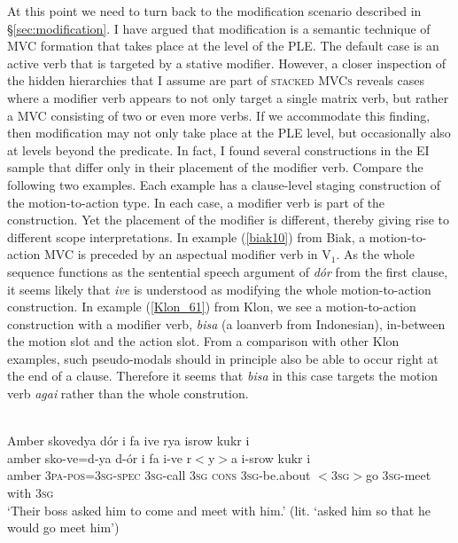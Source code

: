 {At this point we need to turn back to the modification scenario described in §\ref{sec:modification}. I have argued that modification is a semantic technique of MVC formation that takes place at the level of the PLE. The default case is an active verb that is targeted by a stative modifier. However, a closer inspection of the hidden hierarchies that I assume are part of \textsc{stacked MVCs} reveals cases where a modifier verb appears to not only target a single matrix verb, but rather a MVC consisting of two or even more verbs. If we accommodate this finding, then modification may not only take place at the PLE level, but occasionally also at levels beyond the predicate. In fact, I found several constructions in the EI sample that differ only in their placement of the modifier verb. Compare the following two examples. Each example has a clause-level staging construction of the motion-to-action type. In each case, a modifier verb is part of the construction. Yet the placement of the modifier is different, thereby giving rise to different scope interpretations. In example (\ref{biak10}) from Biak, a motion-to-action MVC is preceded by an aspectual modifier verb in V$_1$. As the whole sequence functions as the sentential speech argument of \textit{dór} from the first clause, it seems likely that \textit{ive} is understood as modifying the whole motion-to-action construction. In example (\ref{Klon_61}) from Klon, we see a motion-to-action construction with a modifier verb, \textit{bisa} (a loanverb from Indonesian), in-between the motion slot and the action slot. From a comparison with other Klon examples, such pseudo-modals should in principle also be able to occur right at the end of a clause. Therefore it seems that \textit{bisa} in this case targets the motion verb \textit{agai} rather than the whole constrution.
 
\ea \label{biak10}
\\
\glll Amber skovedya dór i fa ive rya isrow kukr i \\
amber sko-ve=d-ya d-ór i fa i-ve r$<$y$>$a i-srow kukr i \\
amber 3\textsc{pa}-\textsc{pos}=3\textsc{sg}-\textsc{spec} 3\textsc{sg}-call 3\textsc{sg} \textsc{cons} 3\textsc{sg}-be.about $<$3\textsc{sg}$>$go 3\textsc{sg}-meet with 3\textsc{sg}\\
\glft `Their boss asked him to come and meet with him.' (lit. `asked him so that he
would go meet him') \\ 
\z

}
